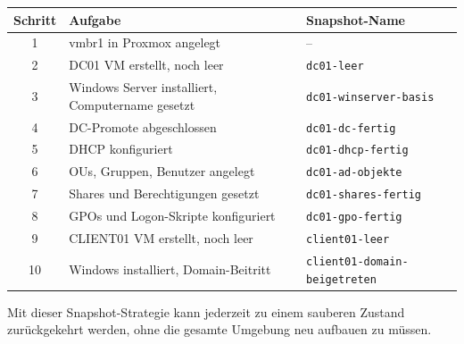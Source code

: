 \documentclass[11pt, oneside, numbers=noenddot]{scrbook}
\begin{document}
\begin{center}
\begin{tabular}{|c|l|l|}
\hline
\textbf{Schritt} & \textbf{Aufgabe} & \textbf{Snapshot-Name} \\
\hline
1 & vmbr1 in Proxmox angelegt & -- \\
2 & DC01 VM erstellt, noch leer & \texttt{dc01-leer} \\
3 & Windows Server installiert, Computername gesetzt & \texttt{dc01-winserver-basis} \\
4 & DC-Promote abgeschlossen & \texttt{dc01-dc-fertig} \\
5 & DHCP konfiguriert & \texttt{dc01-dhcp-fertig} \\
6 & OUs, Gruppen, Benutzer angelegt & \texttt{dc01-ad-objekte} \\
7 & Shares und Berechtigungen gesetzt & \texttt{dc01-shares-fertig} \\
8 & GPOs und Logon-Skripte konfiguriert & \texttt{dc01-gpo-fertig} \\
9 & CLIENT01 VM erstellt, noch leer & \texttt{client01-leer} \\
10 & Windows installiert, Domain-Beitritt & \texttt{client01-domain-beigetreten} \\
\hline
\end{tabular}
\end{center}

Mit dieser Snapshot-Strategie kann jederzeit zu einem sauberen Zustand zurückgekehrt werden, ohne die gesamte Umgebung neu aufbauen zu müssen.
\end{document}
